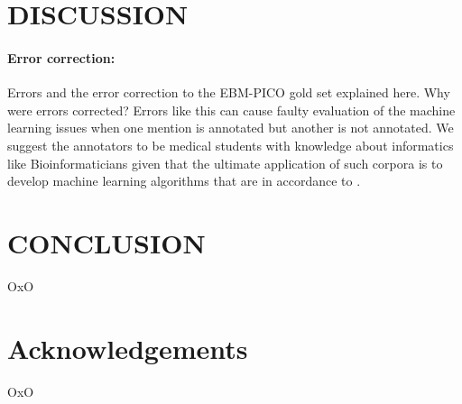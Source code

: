 \documentclass[10.7pt,]{article}
\let\oldparagraph\paragraph
\renewcommand{\paragraph}[1]{\oldparagraph{#1}\mbox{}}
\begin{document}
\section{DISCUSSION}\label{discussion}
%
\paragraph{Error correction: } Errors and the error correction to the EBM-PICO gold set explained here. 
Why were errors corrected?
Errors like this can cause faulty evaluation of the machine learning issues when one mention is annotated but another is not annotated.
We suggest the annotators to be medical students with knowledge about informatics like Bioinformaticians given that the ultimate application of such corpora is to develop machine learning algorithms that are in accordance to .
%
%
%
\section{CONCLUSION}\label{conclusion}
%
OxO
%
%
%
\section{Acknowledgements}\label{acknowledgements}
%
OxO
%
%
%


\end{document}
